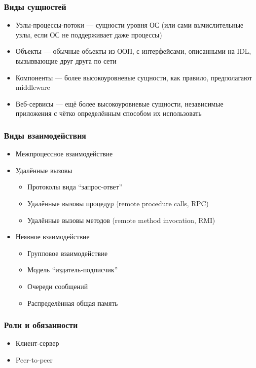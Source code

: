 \documentclass[xetex,mathserif,serif]{beamer}
\begin{document}
	\begin{frame}
		\frametitle{Виды сущностей}
		\begin{itemize}
			\item Узлы-процессы-потоки --- сущности уровня ОС (или сами вычислительные узлы, если ОС не поддерживает даже процессы)
			\item Объекты --- обычные объекты из ООП, с интерфейсами, описанными на IDL, вызыввающие друг друга по сети
			\item Компоненты --- более высокоуровневые сущности, как правило, предполагают middleware
			\item Веб-сервисы --- ещё более высокоуровневые сущности, независимые приложения с чётко определённым способом их использовать
		\end{itemize}
	\end{frame}

	\begin{frame}
		\frametitle{Виды взаимодействия}
		\begin{itemize}
			\item Межпроцессное взаимодействие
			\item Удалённые вызовы
			\begin{itemize}
				\item Протоколы вида ``запрос-ответ''
				\item Удалённые вызовы процедур (remote procedure calls, RPC)
				\item Удалённые вызовы методов (remote method invocation, RMI)
			\end{itemize}
			\item Неявное взаимодействие
			\begin{itemize}
				\item Групповое взаимодействие
				\item Модель “издатель-подписчик”
				\item Очереди сообщений
				\item Распределённая общая память
			\end{itemize}
		\end{itemize}
	\end{frame}

	\begin{frame}
		\frametitle{Роли и обязанности}
		\begin{itemize}
			\item Клиент-сервер
			\item Peer-to-peer
		\end{itemize}
	\end{frame}
\end{document}
